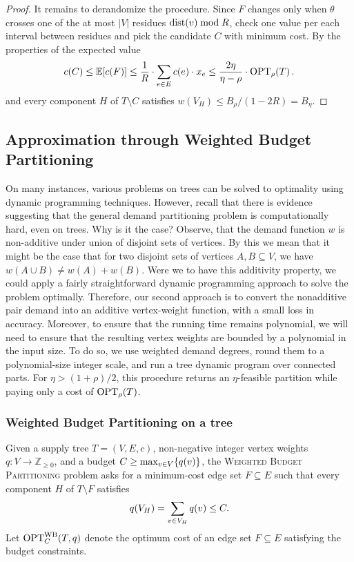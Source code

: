 \begin{proof}
    It remains to derandomize the procedure. Since $F$ changes only when $\theta$ crosses one of the at most $|V|$ residues $\text{dist}(v)\bmod R$, check one value per each interval between residues and pick the candidate $C$ with minimum cost. By the properties of the expected value
    \[
        c(C)\leq \mathbb{E}[c(F)]\leq \frac{1}{R}\cdot \sum_{e\in E}c(e)\cdot x_e
        \leq\frac{2\eta}{\eta-\rho}\cdot \textup{OPT}_{\rho}\mathopen{}\left( T \right).
    \]
    and every component $H$ of $T\setminus C$ satisfies $w(V_H)\leq B_\rho/(1-2R)=B_\eta$.
\end{proof}

% 

\iffalse
\subsection{Approximation through Weighted Budget Partitioning}
On many instances, various problems on trees can be solved to optimality using dynamic programming techniques. However, recall that there is evidence suggesting that the general demand partitioning problem is computationally hard, even on trees. Why is it the case? Observe, that the demand function $w$ is non-additive under union of disjoint sets of vertices. By this we mean that it might be the case that for two disjoint sets of vertices $A,B\subseteq V$, we have $w(A\cup B) \neq w(A) + w(B)$. Were we to have this additivity property, we could apply a fairly straightforward dynamic programming approach to solve the problem optimally.
Therefore, our second approach is to convert the nonadditive pair demand into an additive vertex-weight function, with a small loss in accuracy. Moreover, to ensure that the running time remains polynomial, we will need to ensure that the resulting vertex weights are bounded by a polynomial in the input size.
To do so, we use weighted demand degrees, round them to a polynomial-size integer scale, and run a tree dynamic program over connected parts. For $\eta>(1+\rho)/2$, this procedure returns an $\eta$-feasible partition while paying only a cost of $\textup{OPT}_{\rho}\mathopen{}\left( T \right)$.
\subsubsection{Weighted Budget Partitioning on a tree}

Given a supply tree $T=(V,E,c)$, non-negative integer vertex weights $q\colon V\to\mathbb{Z}_{\geq0}$, and a budget $C\geq\max_{v\in V}\mathopen{}\left\{ q(v) \right\}$, the \textsc{Weighted Budget Partitioning} problem asks for a minimum-cost edge set $F\subseteq E$ such that every component $H$ of $T\setminus F$ satisfies
\[
    q\mathopen{}\left( V_H \right)=\sum_{v\in V_H}q(v)\leq C.
\]
Let $\textup{OPT}^{\mathrm{WB}}_C(T,q)$ denote the optimum cost of an edge set $F\subseteq E$ satisfying the budget constraints.

